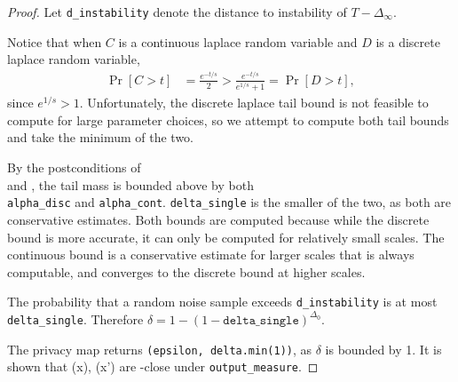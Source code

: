 \documentclass{article}
\begin{document}
\begin{proof}
    Let \texttt{d\_instability} denote the distance to instability of $T - \Delta_\infty$.

    Notice that when $C$ is a continuous laplace random variable and $D$ is a discrete laplace random variable,
    \begin{align}
        \Pr[C > t] &= \frac{e^{-t/s}}{2} > \frac{e^{-t/s}}{e^{1/s} + 1} = \Pr[D > t],
    \end{align}
    since $e^{1/s} > 1$.
    Unfortunately, the discrete laplace tail bound is not feasible to compute for large parameter choices,
    so we attempt to compute both tail bounds and take the minimum of the two.

    By the postconditions of  \\
    and ,
    the tail mass is bounded above by both \\\texttt{alpha\_disc} and \texttt{alpha\_cont}.
    \texttt{delta\_single} is the smaller of the two, as both are conservative estimates.
    Both bounds are computed because while the discrete bound is more accurate, it can only be computed for relatively small scales.
    The continuous bound is a conservative estimate for larger scales that is always computable, 
    and converges to the discrete bound at higher scales.

    The probability that a random noise sample exceeds \texttt{d\_instability} is at most \texttt{delta\_single}.
    Therefore $\delta = 1 - (1 - \texttt{delta\_single})^{\Delta_0}$.

    The privacy map returns \texttt{(epsilon, delta.min(1))}, as $\delta$ is bounded by 1.
    It is shown that \function(x), \function(x') are \dout-close under \texttt{output\_measure}.
\end{proof}



\end{document}
